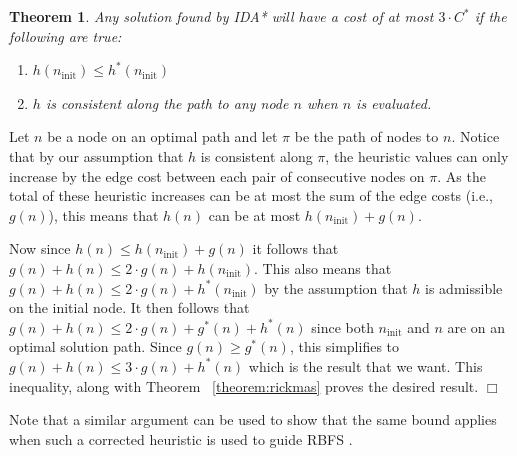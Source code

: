 \documentclass[letterpaper]{article}
\newtheorem{theorem}{Theorem}
\newenvironment{proof}{\par\noindent{\em Proof.}}{\hfill $\Box$\medskip}
\begin{document}
\begin{theorem}
Any solution found by IDA* will have a cost of at most $3 \cdot C^*$ if the following are true:
\begin{enumerate}
    \item $h(n_{\mathrm{init}}) \leq h^*(n_{\mathrm{init}})$
    \item $h$ is consistent along the path to any node $n$ when $n$ is evaluated.
\end{enumerate}
\label{the:h_increase_policy}
\end{theorem}
\begin{proof}
%
Let $n$ be a node on an optimal path %
and let $\pi$ be the path of nodes to $n$.
Notice that by our assumption that $h$ is consistent along $\pi$, the heuristic values can only increase by the edge cost between each pair of consecutive nodes on $\pi$.
As the total of these heuristic increases can be at most the sum of the edge costs (i.e., $g(n)$), this means that $h(n)$ can be at most $h(n_{\mathrm{init}}) + g(n)$.

Now since $h(n) \leq h(n_{\mathrm{init}}) + g(n)$ it follows that $g(n) + h(n) \leq 2 \cdot g(n) + h(n_{\mathrm{init}})$. This also means that $g(n) + h(n) \leq 2 \cdot g(n) + h^*(n_{\mathrm{init}})$ by the assumption that $h$ is admissible on the initial node.
It then follows that $g(n) + h(n) \leq 2 \cdot g(n) + g^*(n) + h^*(n)$ since 
both $n_{\mathrm{init}}$ and $n$ are on an optimal solution path.
Since $g(n) \geq g^*(n)$, this simplifies to $g(n) + h(n) \leq 3 \cdot g(n) + h^*(n)$ which is the result that we want. This inequality, along with Theorem 
~\ref{theorem:rickmas} 
proves the desired result.
\end{proof}

Note that a similar argument can be used to show that the same bound applies when such a corrected heuristic is used to guide RBFS \cite{Korf1992}.
\end{document}
